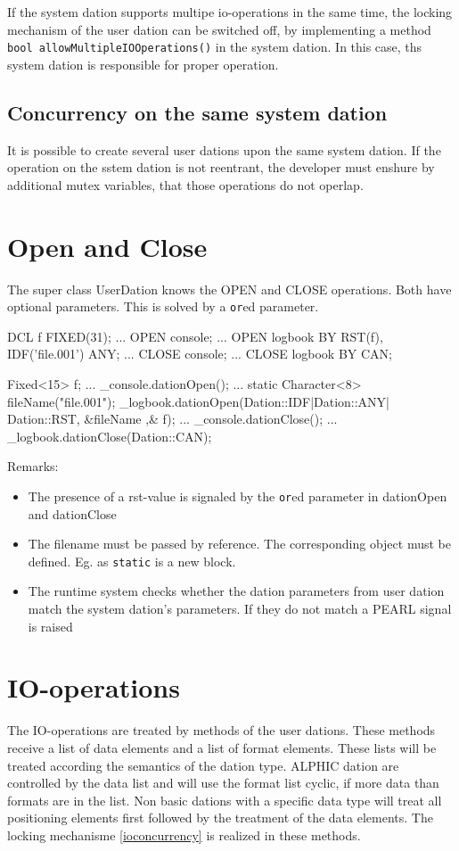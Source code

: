 If the system dation supports multipe io-operations in the same time,
the locking mechanism of the user dation can be switched off, by implementing
a method \verb|bool allowMultipleIOOperations()| in the system dation.
In this case, ths system dation is responsible for proper operation.

\subsection{Concurrency on the same system dation}
It is possible to create several user dations upon the same system dation.
If the operation on the sstem dation is not reentrant, the developer must
enshure by additional mutex variables, that those operations do not operlap.

\section{Open and Close}
The super class UserDation knows the OPEN and CLOSE operations.
Both have optional parameters. This is solved by a \verb|or|ed
parameter.

\begin{PEARLCode}
DCL f FIXED(31);
...
OPEN console;
...
OPEN logbook BY RST(f), IDF('file.001') ANY;
...
CLOSE console;
...
CLOSE logbook BY CAN;
\end{PEARLCode}

\begin{CppCode}
Fixed<15> f;
...
_console.dationOpen();
...
{
   static Character<8> fileName("file.001");
   _logbook.dationOpen(Dation::IDF|Dation::ANY| Dation::RST, &fileName ,& f);
}
...
_console.dationClose();
...
_logbook.dationClose(Dation::CAN);
\end{CppCode}

Remarks:
\begin{itemize}
\item The presence of a rst-value is signaled by the \verb|or|ed parameter
   in dationOpen and dationClose
\item The filename must be passed by reference. The corresponding
   object must be defined. Eg. as \verb|static| is a new block.
\item The runtime system checks whether the dation parameters from
   user dation match the system dation's parameters. 
   If they do not match a PEARL signal is raised
\end{itemize}

\section{IO-operations}
The IO-operations are treated by methods  of the user dations.
These methods receive a list of data elements and a list of format
elements. These lists will be treated according the semantics of the dation
type. ALPHIC dation are controlled by the data list and will use
the format list cyclic, if more data than formats are in the list.
Non basic dations with a specific data type will treat all positioning
elements first followed by the treatment of the data elements. 
The locking mechanisme \ref{ioconcurrency} is realized in these methods.

